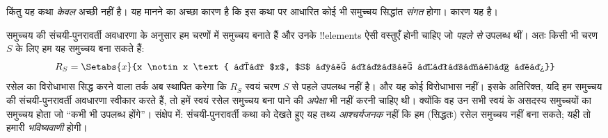 \documentclass[../../../include/open-logic-section]{subfiles}
\begin{document}
किंतु यह कथा \emph{केवल} अच्छी नहीं है। यह मानने का अच्छा कारण है कि इस
कथा पर आधारित कोई भी समुच्चय सिद्धांत \emph{संगत} होगा। कारण यह है।

समुच्चय की संचयी-पुनरावर्ती अवधारणा के अनुसार हम चरणों में समुच्चय बनाते हैं
और उनके !!{element}s ऐसी वस्तुएँ होनी चाहिए जो \emph{पहले से} उपलब्ध थीं।
अतः किसी भी चरण~$S$ के लिए हम यह समुच्चय बना सकते हैं:
\[
	R_S = \Setabs{x}{x \notin x \text{ और $x$, $S$ से पहले उपलब्ध था}}
\]
रसेल का विरोधाभास सिद्ध करने वाला तर्क अब स्थापित करेगा कि $R_S$ स्वयं
चरण $S$ से पहले उपलब्ध नहीं है। और यह कोई विरोधाभास नहीं। इसके अतिरिक्त,
यदि हम समुच्चय की संचयी-पुनरावर्ती अवधारणा स्वीकार करते हैं, तो हमें स्वयं
रसेल समुच्चय बना पाने की \emph{अपेक्षा} भी नहीं करनी चाहिए थी। क्योंकि वह
उन सभी स्वयं के असदस्य समुच्चयों का समुच्चय होता जो ``कभी भी उपलब्ध होंगे''।
संक्षेप में: संचयी-पुनरावर्ती कथा को देखते हुए यह तथ्य \emph{आश्चर्यजनक}
नहीं कि हम (सिद्धतः) रसेल समुच्चय नहीं बना सकते; यही तो हमारी
\emph{भविष्यवाणी} होगी।

%

\end{document}
